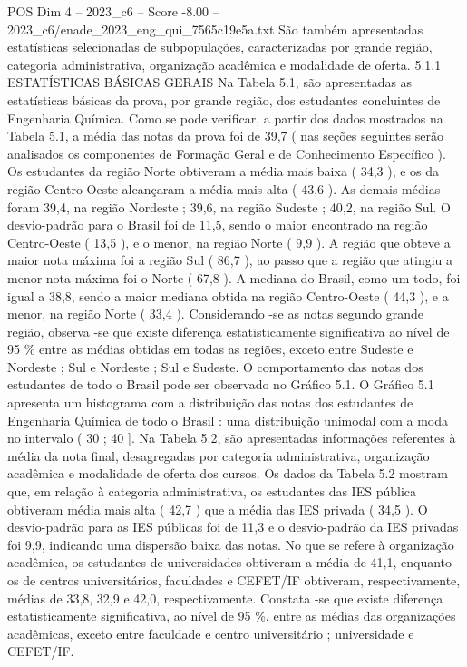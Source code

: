 \begin{textsample}{POS Dim 4 – 2023\_c6 – Score -8.00 – 2023\_c6/enade\_2023\_eng\_qui\_7565c19e5a.txt}
São também apresentadas estatísticas selecionadas de subpopulações, caracterizadas por grande região, categoria administrativa, organização acadêmica e modalidade de oferta. 5.1.1 ESTATÍSTICAS BÁSICAS GERAIS Na Tabela 5.1, são apresentadas as estatísticas básicas da prova, por grande região, dos estudantes concluintes de Engenharia Química.
Como se pode verificar, a partir dos dados mostrados na Tabela 5.1, a média das notas da prova foi de 39,7 ( nas seções seguintes serão analisados os componentes de Formação Geral e de Conhecimento Específico ).
Os estudantes da região Norte obtiveram a média mais baixa ( 34,3 ), e os da região Centro-Oeste alcançaram a média mais alta ( 43,6 ).
As demais médias foram 39,4, na região Nordeste ; 39,6, na região Sudeste ; 40,2, na região Sul.
O desvio-padrão para o Brasil foi de 11,5, sendo o maior encontrado na região Centro-Oeste ( 13,5 ), e o menor, na região Norte ( 9,9 ).
A região que obteve a maior nota máxima foi a região Sul ( 86,7 ), ao passo que a região que atingiu a menor nota máxima foi o Norte ( 67,8 ).
A mediana do Brasil, como um todo, foi igual a 38,8, sendo a maior mediana obtida na região Centro-Oeste ( 44,3 ), e a menor, na região Norte ( 33,4 ).
Considerando -se as notas segundo grande região, observa -se que existe diferença estatisticamente significativa ao nível de 95 \% entre as médias obtidas em todas as regiões, exceto entre Sudeste e Nordeste ; Sul e Nordeste ; Sul e Sudeste.
O comportamento das notas dos estudantes de todo o Brasil pode ser observado no Gráfico 5.1.
O Gráfico 5.1 apresenta um histograma com a distribuição das notas dos estudantes de Engenharia Química de todo o Brasil : uma distribuição unimodal com a moda no intervalo ( 30 ; 40 ].
Na Tabela 5.2, são apresentadas informações referentes à média da nota final, desagregadas por categoria administrativa, organização acadêmica e modalidade de oferta dos cursos.
Os dados da Tabela 5.2 mostram que, em relação à categoria administrativa, os estudantes das IES pública obtiveram média mais alta ( 42,7 ) que a média das IES privada ( 34,5 ).
O desvio-padrão para as IES públicas foi de 11,3 e o desvio-padrão da IES privadas foi 9,9, indicando uma dispersão baixa das notas.
No que se refere à organização acadêmica, os estudantes de universidades obtiveram a média de 41,1, enquanto os de centros universitários, faculdades e CEFET/IF obtiveram, respectivamente, médias de 33,8, 32,9 e 42,0, respectivamente.
Constata -se que existe diferença estatisticamente significativa, ao nível de 95 \%, entre as médias das organizações acadêmicas, exceto entre faculdade e centro universitário ; universidade e CEFET/IF.

\end{textsample}
